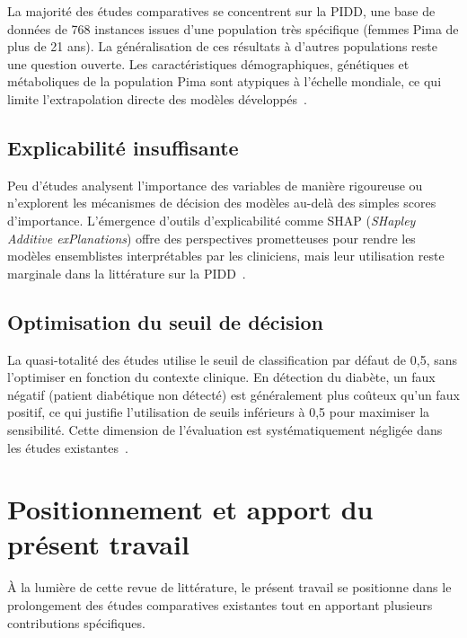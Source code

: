 La majorité des études comparatives se concentrent sur la PIDD, une base de données de
768 instances issues d'une population très spécifique (femmes Pima de plus de 21 ans).
La généralisation de ces résultats à d'autres populations reste une question ouverte. Les
caractéristiques démographiques, génétiques et métaboliques de la population Pima sont
atypiques à l'échelle mondiale, ce qui limite l'extrapolation directe des modèles
développés~\citep{zou2018, wee2024}.

\subsection{Explicabilité insuffisante}

Peu d'études analysent l'importance des variables de manière rigoureuse ou n'explorent les
mécanismes de décision des modèles au-delà des simples scores d'importance. L'émergence
d'outils d'explicabilité comme SHAP (\textit{SHapley Additive exPlanations}) offre des
perspectives prometteuses pour rendre les modèles ensemblistes interprétables par les
cliniciens, mais leur utilisation reste marginale dans la littérature sur la PIDD~\citep{wee2024}.

\subsection{Optimisation du seuil de décision}

La quasi-totalité des études utilise le seuil de classification par défaut de 0,5, sans
l'optimiser en fonction du contexte clinique. En détection du diabète, un faux négatif
(patient diabétique non détecté) est généralement plus coûteux qu'un faux positif, ce qui
justifie l'utilisation de seuils inférieurs à 0,5 pour maximiser la sensibilité. Cette
dimension de l'évaluation est systématiquement négligée dans les études
existantes~\citep{khanam2021}.

\section{Positionnement et apport du présent travail}

À la lumière de cette revue de littérature, le présent travail se positionne dans le
prolongement des études comparatives existantes tout en apportant plusieurs contributions
spécifiques.

